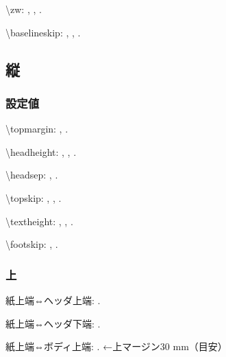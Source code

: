 \documentclass{FITpaper}
\begin{document}
\newlength{\myzw}
\setlength{\myzw}{1\zw}
\textbackslash zw:
\prntlen{\myzw},
\prntlen{\myzw},
\prntlen{\myzw}.

\textbackslash baselineskip:
\prntlen{\baselineskip},
\prntlen{\baselineskip},
\prntlen{\baselineskip}.

\subsection{縦}

\subsubsection{設定値}

\textbackslash topmargin:
\prntlen{\topmargin},
\prntlen{\topmargin}.

\textbackslash headheight:
\prntlen{\headheight},
\prntlen{\headheight},
\prntlen{\headheight}.

\textbackslash headsep:
\prntlen{\headsep},
\prntlen{\headsep}.

\textbackslash topskip:
\prntlen{\topskip},
\prntlen{\topskip},
\prntlen{\topskip}.

\textbackslash textheight:
\prntlen{\textheight},
\prntlen{\textheight},
\prntlen{\textheight}.

\textbackslash footskip:
\prntlen{\footskip},
\prntlen{\footskip}.

\subsubsection{上}

\newlength{\mytop}
\setlength{\mytop}{\topmargin}

\addtolength{\mytop}{1in}

紙上端⇔ヘッダ上端:
\prntlen{\mytop}.

\addtolength{\mytop}{\headheight}

紙上端⇔ヘッダ下端:
\prntlen{\mytop}.

\addtolength{\mytop}{\headsep}

紙上端⇔ボディ上端:
\prntlen{\mytop}.
←上マージン30 mm（目安）
\end{document}
